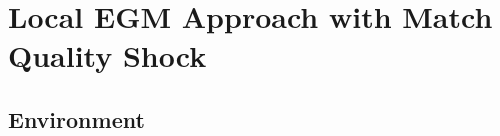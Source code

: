 \documentclass[11pt]{article}
\begin{document}







\section{Local EGM Approach with Match Quality Shock}

\subsection{Environment}
\end{document}
